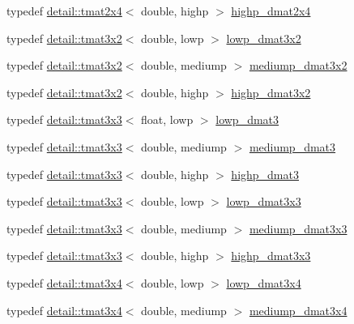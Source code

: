 \begin{DoxyCompactItemize}
\item 
typedef \hyperlink{structglm_1_1detail_1_1tmat2x4}{detail\+::tmat2x4}$<$ double, highp $>$ \hyperlink{group__core__precision_gacd51d8188f7d66a83c035b8c4cd69f2d}{highp\+\_\+dmat2x4}
\item 
typedef \hyperlink{structglm_1_1detail_1_1tmat3x2}{detail\+::tmat3x2}$<$ double, lowp $>$ \hyperlink{group__core__precision_ga678c21e4fadeda255cfb146d40844bdd}{lowp\+\_\+dmat3x2}
\item 
typedef \hyperlink{structglm_1_1detail_1_1tmat3x2}{detail\+::tmat3x2}$<$ double, mediump $>$ \hyperlink{group__core__precision_gaff0060984716bcda68ff69ed27536bf6}{mediump\+\_\+dmat3x2}
\item 
typedef \hyperlink{structglm_1_1detail_1_1tmat3x2}{detail\+::tmat3x2}$<$ double, highp $>$ \hyperlink{group__core__precision_gac956fe6b946f0ccee78367ccd5427351}{highp\+\_\+dmat3x2}
\item 
typedef \hyperlink{structglm_1_1detail_1_1tmat3x3}{detail\+::tmat3x3}$<$ float, lowp $>$ \hyperlink{group__core__precision_ga07d9423bdde2d7ff880d6ece01dc9e32}{lowp\+\_\+dmat3}
\item 
typedef \hyperlink{structglm_1_1detail_1_1tmat3x3}{detail\+::tmat3x3}$<$ double, mediump $>$ \hyperlink{group__core__precision_ga80600af2c1ca11ead6123777185c372d}{mediump\+\_\+dmat3}
\item 
typedef \hyperlink{structglm_1_1detail_1_1tmat3x3}{detail\+::tmat3x3}$<$ double, highp $>$ \hyperlink{group__core__precision_ga993461e1d2caf19abd4f64d02ccdafa9}{highp\+\_\+dmat3}
\item 
typedef \hyperlink{structglm_1_1detail_1_1tmat3x3}{detail\+::tmat3x3}$<$ double, lowp $>$ \hyperlink{group__core__precision_gaea1bc4ede38e1b904f01ff5ce59210ea}{lowp\+\_\+dmat3x3}
\item 
typedef \hyperlink{structglm_1_1detail_1_1tmat3x3}{detail\+::tmat3x3}$<$ double, mediump $>$ \hyperlink{group__core__precision_ga2f73508d8192390ca9f9b569f544fade}{mediump\+\_\+dmat3x3}
\item 
typedef \hyperlink{structglm_1_1detail_1_1tmat3x3}{detail\+::tmat3x3}$<$ double, highp $>$ \hyperlink{group__core__precision_gad7229dea82287910d88e6e8566e39fc7}{highp\+\_\+dmat3x3}
\item 
typedef \hyperlink{structglm_1_1detail_1_1tmat3x4}{detail\+::tmat3x4}$<$ double, lowp $>$ \hyperlink{group__core__precision_ga4640e1d20ad705842525e79a4cc57b15}{lowp\+\_\+dmat3x4}
\item 
typedef \hyperlink{structglm_1_1detail_1_1tmat3x4}{detail\+::tmat3x4}$<$ double, mediump $>$ \hyperlink{group__core__precision_gaedd814e706701200b13b86fc6fd7b373}{mediump\+\_\+dmat3x4}

\end{DoxyCompactItemize}
